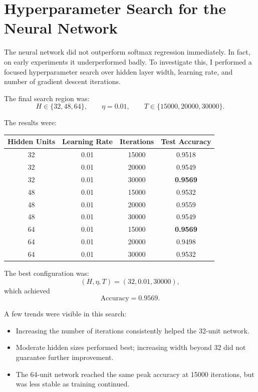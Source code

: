 \documentclass[11pt]{article}
\begin{document}
\section*{Hyperparameter Search for the Neural Network}

The neural network did not outperform softmax regression immediately. In fact, on early experiments it underperformed badly. To investigate this, I performed a focused hyperparameter search over hidden layer width, learning rate, and number of gradient descent iterations.

The final search region was:
\[
H \in \{32,48,64\}, \qquad \eta = 0.01, \qquad T \in \{15000,20000,30000\}.
\]

The results were:

\begin{center}
\begin{tabular}{cccc}
\toprule
\textbf{Hidden Units} & \textbf{Learning Rate} & \textbf{Iterations} & \textbf{Test Accuracy} \\
\midrule
32 & 0.01 & 15000 & 0.9518 \\
32 & 0.01 & 20000 & 0.9549 \\
32 & 0.01 & 30000 & \textbf{0.9569} \\
48 & 0.01 & 15000 & 0.9532 \\
48 & 0.01 & 20000 & 0.9559 \\
48 & 0.01 & 30000 & 0.9549 \\
64 & 0.01 & 15000 & \textbf{0.9569} \\
64 & 0.01 & 20000 & 0.9498 \\
64 & 0.01 & 30000 & 0.9532 \\
\bottomrule
\end{tabular}
\end{center}

The best configuration was:
\[
(H,\eta,T) = (32, 0.01, 30000),
\]
which achieved
\[
\text{Accuracy} = 0.9569.
\]

A few trends were visible in this search:

\begin{itemize}
    \item Increasing the number of iterations consistently helped the 32-unit network.
    \item Moderate hidden sizes performed best; increasing width beyond 32 did not guarantee further improvement.
    \item The 64-unit network reached the same peak accuracy at 15000 iterations, but was less stable as training continued.
\end{itemize}
\end{document}

